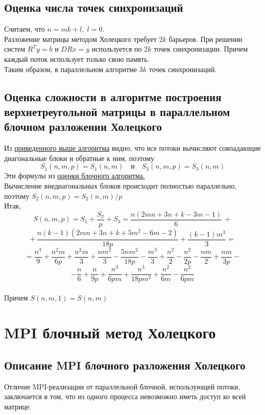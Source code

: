 \documentclass[a4paper,12pt]{article}
\begin{document}
\subsection{Оценка числа точек синхронизаций}
    Считаем, что $n = mk + l,\; l = 0$.\\
    
    Разложение матрицы методом Холецкого требует $2k$ барьеров.
    При решении систем $R^T y = b$ и $DRx = y$ используется по $2k$ точек синхронизации.
    Причем каждый поток использует только свою память.\\
    
    Таким образом, в параллельном алгоритме $3k$ точек синхронизаций.
    

\newpage
\subsection{Оценка сложности в алгоритме построения верхнетреугольной матрицы
в параллельном блочном разложении Холецкого}
    Из \hyperlink{paral_alg}{приведенного выше алгоритма} видно, что все потоки 
    вычисляют совпадающие диагональные блоки и обратные к ним, поэтому 
    $$
        S_1(n,m,p) = S_1(n,m) \quad \text{и} \quad S_3(n,m,p) = S_3(n,m)
    $$
    Эти формулы из \hyperlink{block_border}{оценки блочного алгоритма.} \\
    
    Вычисление внедиагональных блоков происходит полностью параллельно, поэтому 
    $ S_2(n,m,p) = S_2(n,m)/p $ \\

    Итак, 
    $$
        S(n,m,p) = S_1 + \frac{S_2}{p} + S_3 = 
        \frac{n(2mn + 3n + k - 3m -1)}6 \,+ $$$$ +\,
        \frac{n(k-1)(2mn+3n+k+5m^2-6m-2)}{18p} +
        \frac{(k-1)m^3}3 = $$$$ =
        \frac{n^3}9 + \frac{n^2m}{6p} + \frac{n^2m}{3} +
        \frac{nm^2}3 - \frac{5nm^2}{18p} - \frac{m^3}3 +
        \frac{n^2}2 - \frac{n^2}{2p} - \frac{nm}2 + \frac{nm}{3p} - $$$$ -
        \frac{n}6 + \frac{n}{9p} + \frac{n^3}{6pm} + \frac{n^3}{18pm^2} +
        \frac{n^2}{6m} - \frac{n^2}{6pm}
    $$ \\
    
    Причем $S(n,m,1) = S(n,m)$




\newpage
\section{MPI блочный метод Холецкого}
\subsection{Описание MPI блочного разложения Холецкого}
    Отличие MPI-реализации от параллельной блочной, использующей потоки,
    заключается в том, что из одного процесса невозможно иметь доступ
    ко всей матрице. \\
    
\end{document}
